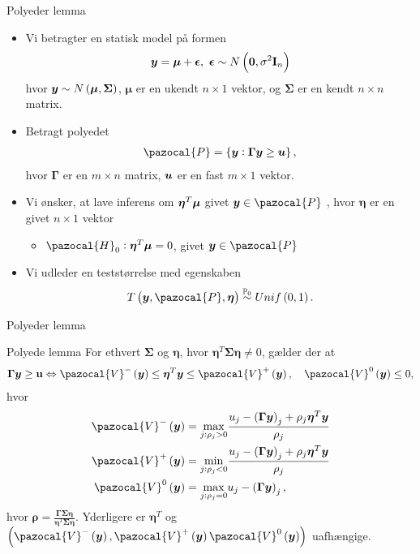 \begin{frame}{Polyeder lemma}
\begin{itemize}
\item Vi betragter en statisk model på formen
\begin{align*}
\vy = \vmu + \veps, \ \veps \sim N \del{\textbf{0}, \sigma^2 \textbf{I}_n}
\end{align*}
hvor $\vy \sim N\del{\boldsymbol\mu, \boldsymbol\Sigma}$, $\boldsymbol \mu$ er en ukendt $n \times 1$ vektor, og $\boldsymbol\Sigma$ er en kendt $n \times n$ matrix. 
\item Betragt polyedet
\begin{align*}
\pazocal{P} = \cbr{\vy: \boldsymbol \Gamma \vy \geq \vu},
\end{align*} 
hvor $\boldsymbol \Gamma $ er en $m \times n$ matrix, $\bm{u}$ er en fast $m \times 1$ vektor.
\item Vi ønsker, at lave inferens om $\boldsymbol \eta^T \bm{\mu}$ givet $\vy \in \pazocal{P}$ , hvor $\boldsymbol \eta$ er en givet $n \times 1$ vektor
\begin{itemize}
\item $\pazocal{H}_0: \boldsymbol \eta^T \boldsymbol \mu = 0$, givet $\vy \in \pazocal{P}$
\end{itemize} 
\item Vi udleder en teststørrelse med egenskaben
\begin{align*}
T\del{ \vy, \pazocal{P}, \boldsymbol \eta} \overset{\mathbb{P}_0}{\sim} Unif \del{0,1}.
\end{align*}
\end{itemize}
\end{frame}

\begin{frame}{Polyeder lemma}
\begin{block}{Polyede lemma}
For ethvert $\boldsymbol \Sigma$ og $\boldsymbol \eta$, hvor $\boldsymbol \eta^T \boldsymbol  \Sigma \boldsymbol \eta \neq 0$, gælder der at
\begin{align*}
\boldsymbol \Gamma \vy \geq \textbf{u} \Leftrightarrow \pazocal{V}^- \del{\vy} \leq \boldsymbol \eta^T \vy \leq  \pazocal{V}^+\del{\vy}, \quad  \pazocal{V}^0 \del{\vy} \leq 0,
\end{align*}
hvor 
\begin{align*}
\pazocal{V}^- \del{\vy} & = \underset{j: \rho_j >0}{\max} \frac{u_j - \del{ \boldsymbol \Gamma \vy}_j + \rho_j \boldsymbol \eta^T \vy}{\rho_j} \\
\pazocal{V}^+ \del{\vy} & = \underset{j: \rho_j < 0}{\min} \frac{u_j - \del{ \boldsymbol \Gamma \vy}_j + \rho_j \boldsymbol \eta^T \vy}{\rho_j}  \\
\pazocal{V}^0 \del{\vy}  &=  \underset{j: \rho_j = 0}{\max} u_j -  \del{ \boldsymbol \Gamma \vy}_j
,\end{align*}
hvor $\boldsymbol \rho = \frac{\boldsymbol \Gamma \boldsymbol \Sigma \boldsymbol \eta}{\boldsymbol \eta^T \boldsymbol \Sigma \boldsymbol \eta}$. 
Yderligere er $\boldsymbol \eta^T$ og $\del{\pazocal{V}^- \del{\vy} , \pazocal{V}^+ \del{\vy} \pazocal{V}^0 \del{\vy}  }$ uafhængige.
\end{block}
\end{frame}

